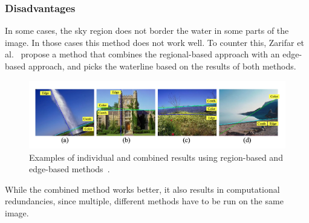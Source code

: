 \subsubsection{Disadvantages}
In some cases, the sky region does not border the water in some
parts of the image. In those cases this method does not work well.
To counter this, Zarifar et al.~\cite{zarifar-2008} propose
a method that combines the regional-based approach with
an edge-based approach, and picks the waterline based on
the results of both methods.

\begin{figure}[H]
  \includegraphics*[width=\textwidth]{two.png}
  \caption{
    Examples of individual and combined results using
    region-based and edge-based methods~\cite{zarifar-2008}.
  }
\end{figure}

While the combined method works better, it also results in computational
redundancies, since multiple, different methods have to be run on the same image.
